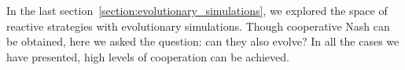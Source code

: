 \documentclass{article}
\theoremstyle{definition}
\begin{document}
In the last section~\ref{section:evolutionary_simulations}, we explored the
space of reactive strategies with evolutionary simulations. Though cooperative
Nash can be obtained, here we asked the question: can they also evolve? In all
the cases we have presented, high levels of cooperation can be achieved.

\appendix



\newpage


\end{document}
